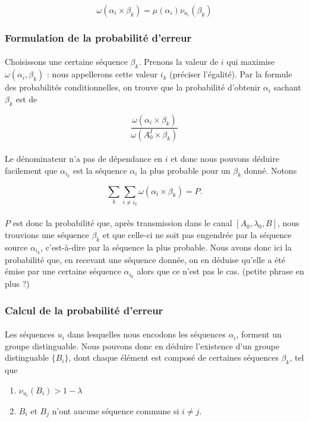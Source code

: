 	\[\omega(\alpha_i\times\beta_k)=\mu(\alpha_i)\nu_{u_i}(\beta_k)\]
	
\subsubsection*{Formulation de la probabilité d'erreur}
	
	\paragraph{}
	Choisissons une certaine séquence $\beta_k$.
	Prenons la valeur de $i$ qui maximise $\omega(\alpha_i,\beta_k)$ : nous appellerons cette valeur $i_k$ (préciser l'égalité).
	Par la formule des probabilités conditionnelles, on trouve que la probabilité d'obtenir $\alpha_i$ sachant $\beta_k$ est de 
	
	\[\frac{\omega(\alpha_i \times \beta_k)}{\omega(A_0^I \times \beta_k)}\]
	
	\paragraph{}
	Le dénominateur n'a pas de dépendance en $i$ et donc nous pouvons déduire facilement que $\alpha_{i_k}$ est la séquence $\alpha_i$ la plus probable pour un $\beta_k$ donné.
	Notons
	
	\[\sum_k\sum_{i\neq i_k}\omega(\alpha_i \times \beta_k) = P.\]
	
	\paragraph{}
	$P$ est donc la probabilité que, après transmission dans le canal $[A_0,\lambda_0,B]$, nous trouvions une séquence $\beta_k$ et que celle-ci ne soit pas engendrée par 
	la séquence source $\alpha_{i_k}$, c'est-à-dire par la séquence la plus probable. Nous avons donc ici la probabilité que, en recevant une séquence donnée, on en déduise
	qu'elle a été émise par une certaine séquence $\alpha_{i_k}$ alors que ce n'est pas le cas. (petite phrase en plus ?)
	
\subsubsection*{Calcul de la probabilité d'erreur}
	
	\paragraph{}
	Les séquences $u_i$ dans lesquelles nous encodons les séquences $\alpha_i$, forment un groupe distinguable. Nous pouvons donc en déduire l'existence d'un groupe distinguable $\{B_i\}$, dont 
	chaque élément est composé de certaines séquences $\beta_k$, tel que 
	\begin{enumerate}
		\item $\nu_{u_i}(B_i) > 1-\lambda$
		\item $B_i$ et $B_j$ n'ont aucune séquence commune si $i\neq j$.
	\end{enumerate}
	
